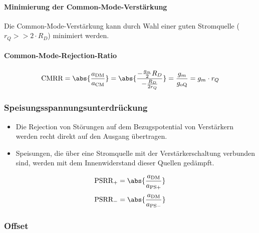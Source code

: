 \paragraph{Minimierung der Common-Mode-Verstärkung}
Die Common-Mode-Verstärkung kann durch Wahl einer guten Stromquelle ($r_Q >> 2 \cdot R_D$) minimiert werden.

\paragraph{Common-Mode-Rejection-Ratio}

\vspace{-0.2cm}

\[
    \text{CMRR} = \abs{\frac{a_{\rm DM}}{a_{\rm CM}}} = \abs{\frac{-\frac{g_m}{2} R_D}{- \frac{R_D}{2 r_Q}}} = \frac{g_m}{g_{\rm oQ}} = g_m \cdot r_Q
\]

\subsubsection{Speisungsspannungsunterdrückung}


\begin{minipage}[c]{0.68\columnwidth}
    \begin{itemize}
        \item Die Rejection von Störungen auf dem Bezugspotential von Verstärkern werden recht direkt auf den Ausgang übertragen.
        \item Speisungen, die über eine Stromquelle mit der Verstärkerschaltung verbunden sind, werden mit dem Innenwiderstand dieser Quellen gedämpft.
    \end{itemize}
\end{minipage}
\hfill
\begin{minipage}[c]{0.3\columnwidth}
    \[
        \text{PSRR}_+ = \abs{\frac{a_{\rm DM}}{a_{\rm PS+}}}
    \]
    \[
        \text{PSRR}_- = \abs{\frac{a_{\rm DM}}{a_{\rm PS-}}}
    \]
\end{minipage}


\subsubsection{Offset}

